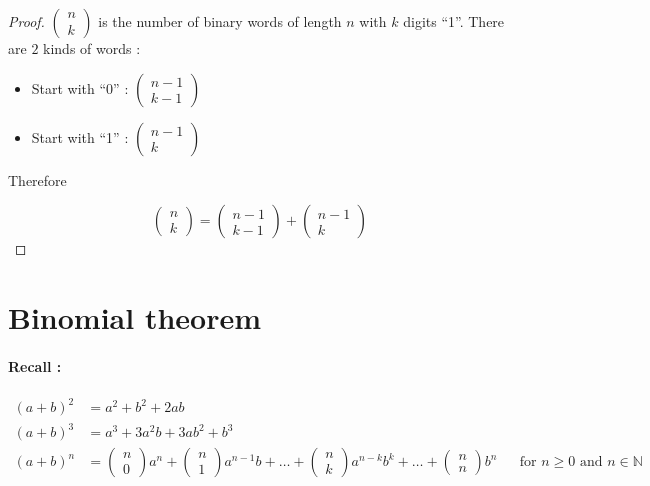 \documentclass[a4paper,11pt]{report}
\begin{document}
\begin{proof}
  $\begin{pmatrix} n \\ k\end{pmatrix}$ is the number of binary words of length
  $n$ with $k$ digits ``1''. There are $2$ kinds of words :
  \begin{itemize}
  \item Start with ``0'' : $\begin{pmatrix} n-1 \\ k-1\end{pmatrix}$
  \item Start with ``1'' : $\begin{pmatrix} n-1 \\ k\end{pmatrix}$
  \end{itemize}

  Therefore
  
  \[
    \begin{pmatrix} n \\ k\end{pmatrix} = \begin{pmatrix} n-1 \\
      k-1\end{pmatrix} + \begin{pmatrix} n-1 \\ k\end{pmatrix}
  \]
\end{proof}

\section{Binomial theorem}
\paragraph{Recall : }
\begin{align*}
  (a+b)^2 &= a^2 + b^2 + 2ab \\
  (a+b)^3 &= a^3 + 3a^2b + 3ab^2 + b^3 \\
  (a+b)^n &=
            \begin{pmatrix} n \\ 0\end{pmatrix} a^n +
  \begin{pmatrix} n \\ 1\end{pmatrix} a^{n-1} b + \dots +
  \begin{pmatrix} n \\ k\end{pmatrix} a^{n-k} b^k + \dots +
  \begin{pmatrix} n \\ n\end{pmatrix} b^n
          && \text{for $n \geq 0$ and $n \in \mathbb{N}$} \\
\end{align*}
\end{document}
